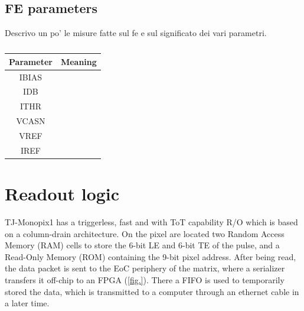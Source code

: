     \subsection{FE parameters}
    Descrivo un po' le misure fatte sul fe e sul significato dei vari parametri.\\
    \begin{table}
        \begin{center}
        \begin{tabular}{|c | c |}
        \hline
        Parameter & Meaning\\
        \hline
        \hline
        IBIAS\\
        IDB\\
        ITHR \\
        VCASN\\
        VREF\\
        IREF\\
        \hline
        \end{tabular}
        \caption{}
        \label{tab:FE-parameters}
        \end{center}
     \end{table}
    
\section{Readout logic}
    TJ-Monopix1 has a triggerless, fast and with ToT capability R/O which is based on a column-drain architecture.      
    On the pixel are located two Random Access Memory (RAM) cells to store the 6-bit LE and 6-bit TE of the pulse, and a Read-Only Memory (ROM) containing the 9-bit pixel address.   
    After being read, the data packet is sent to the EoC periphery of the matrix, where a serializer transfers it off-chip to an FPGA (\ref{fig.}). There a FIFO is used to temporarily stored the data, which is transmitted to a computer through an ethernet cable in a later time.  
    
  

